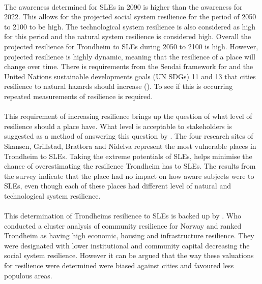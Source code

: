 \paragraph{}
The awareness determined for SLEs in 2090 is higher than the awareness for 2022. This allows for the projected social system resilience for the period of 2050 to 2100 to be high. The technological system resilience is also considered as high for this period and the natural system resilience is considered high. Overall the projected resilience for Trondheim to SLEs during 2050 to 2100 is high. However, projected resilience is highly dynamic, meaning that the resilience of a place will change over time. There is requirements from the Sendai framework for and the United Nations sustainable developments goals (UN SDGs) 11 and 13 that cities resilience to natural hazards should increase (\cite{gonzalez-riancho_storm_2017}). To see if this is occurring repeated measurements of resilience is required. 

\paragraph{}
This requirement of increasing resilience brings up the question of what level of resilience should a place have. What level is acceptable to stakeholders is suggested as a method of answering this question by \cite{gerkensmeier_governing_2018}. The four research sites of Skansen, Grillstad, Brattora and Nidelva represent the most vulnerable places in Trondheim to SLEs. Taking the extreme potentials of SLEs, helps minimise the chance of overestimating the resilience Trondheim has to SLEs. The results from the survey indicate that the place had no impact on how aware subjects were to SLEs, even though each of these places had different level of natural and technological system resilience. 
\paragraph{}
This determination of Trondheims resilience to SLEs is backed up by \cite{opach_seeking_2020}. Who conducted a cluster analysis of community resilience for Norway and ranked Trondheim as having high economic, housing and infrastructure resilience. They were designated with lower institutional and community capital decreasing the social system resilience. However it can be argued that the way these valuations for resilience were determined were biased against cities and favoured less populous areas.



